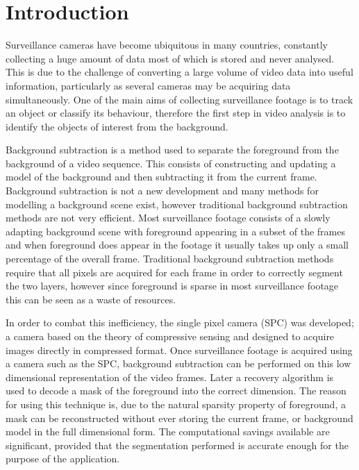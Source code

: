 \documentclass[conference]{IEEEtran}
\begin{document}
\section{Introduction}
Surveillance cameras have become ubiquitous in many countries, constantly collecting a huge amount of data most of which is stored and never analysed. This is due to the challenge of converting a large volume of video data into useful information, particularly as several cameras may be acquiring data simultaneously. One of the main aims of collecting surveillance footage is to track an object or classify its behaviour, therefore the first step in video analysis is to identify the objects of interest from the background.


Background subtraction \cite{Piccardi2004a} is a method used to separate the foreground from the background of a video sequence. This consists of constructing and updating a model of the background and then subtracting it from the current frame. Background subtraction is not a new development and many methods for modelling a background scene exist, however traditional background subtraction methods are not very efficient. Most surveillance footage consists of a slowly adapting background scene with foreground appearing in a subset of the frames and when foreground does appear in the footage it usually takes up only a small percentage of the overall frame. Traditional background subtraction methods require that all pixels are acquired for each frame in order to correctly segment the two layers, however since foreground is sparse in most surveillance footage this can be seen as a waste of resources. 

In order to combat this inefficiency, the single pixel camera (SPC) \cite{Duarte2008a} was developed; a camera based on the theory of compressive sensing \cite{Candes2006, Candes2006a, Donoho2006} and designed to acquire images directly in compressed format. Once surveillance footage is acquired using a camera such as the SPC, background subtraction can be performed on this low dimensional representation of the video frames. Later a recovery algorithm is used to decode a mask of the foreground into the correct dimension. The reason for using this technique is, due to the natural sparsity property of foreground, a mask can be reconstructed without ever storing the current frame, or background model in the full dimensional form. The computational savings available are significant, provided that the segmentation performed is accurate enough for the purpose of the application. 
\end{document}
